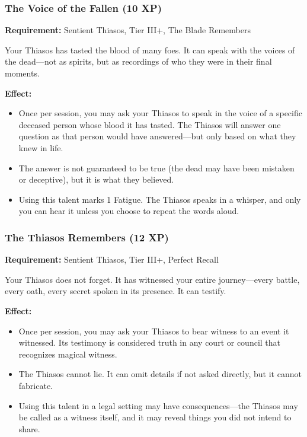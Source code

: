 \subsubsection{The Voice of the Fallen (10 XP)}

\textbf{Requirement:} Sentient Thiasos, Tier III+, The Blade Remembers

Your Thiasos has tasted the blood of many foes. It can speak with the voices of the dead—not as spirits, but as recordings of who they were in their final moments.

\textbf{Effect:}
\begin{itemize}
\item Once per session, you may ask your Thiasos to speak in the voice of a specific deceased person whose blood it has tasted. The Thiasos will answer one question as that person would have answered—but only based on what they knew in life.
\item The answer is not guaranteed to be true (the dead may have been mistaken or deceptive), but it is what they believed.
\item Using this talent marks 1 Fatigue. The Thiasos speaks in a whisper, and only you can hear it unless you choose to repeat the words aloud.
\end{itemize}

\subsubsection{The Thiasos Remembers (12 XP)}

\textbf{Requirement:} Sentient Thiasos, Tier III+, Perfect Recall

Your Thiasos does not forget. It has witnessed your entire journey—every battle, every oath, every secret spoken in its presence. It can testify.

\textbf{Effect:}
\begin{itemize}
\item Once per session, you may ask your Thiasos to bear witness to an event it witnessed. Its testimony is considered truth in any court or council that recognizes magical witness.
\item The Thiasos cannot lie. It can omit details if not asked directly, but it cannot fabricate.
\item Using this talent in a legal setting may have consequences—the Thiasos may be called as a witness itself, and it may reveal things you did not intend to share.
\end{itemize}

